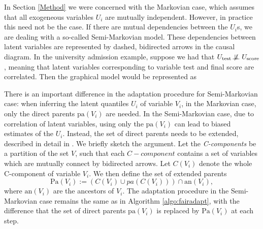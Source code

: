 \documentclass[
  notitle]{jss}
\begin{document}
In Section \ref{Method} we were concerned with the Markovian case, which
assumes that all exogeneous variables \(U_i\) are mutually independent.
However, in practice this need not be the case. If there are mutual
dependencies between the \(U_i\)s, we are dealing with a so-called
Semi-Markovian model. These dependencies between latent variables are
represented by dashed, bidirected arrows in the causal diagram. In the
university admission example, suppose we had that
\(U_{\text{test}} \not\!\perp\!\!\!\perp U_{\text{score}}\), meaning
that latent variables corresponding to variable test and final score are
correlated. Then the graphical model would be represented as

\begin{center}
\end{center}

There is an important difference in the adaptation procedure for
Semi-Markovian case: when inferring the latent quantiles \(U_i\) of
variable \(V_i\), in the Markovian case, only the direct parents
\(\mathrm{pa}(V_i)\) are needed. In the Semi-Markovian case, due to
correlation of latent variables, using only the \(\mathrm{pa}(V_i)\) can
lead to biased estimates of the \(U_i\). Instead, the set of direct
parents needs to be extended, described in detail in
\citep{tian2002general}. We briefly sketch the argument. Let the
\textit{C-components} be a partition of the set \(V\), such that each
\(C-component\) contains a set of variables which are mutually connect
by bidirected arrows. Let \(C(V_i)\) denote the whole C-component of
variable \(V_i\). We then define the set of extended parents
\[\mathrm{Pa}(V_i) := (C(V_i) \cup pa(C(V_i))) \cap \mathrm{an}(V_i),\]
where \(\mathrm{an}(V_i)\) are the ancestors of \(V_i\). The adaptation
procedure in the Semi-Markovian case remains the same as in Algorithm
\ref{algo:fairadapt}, with the difference that the set of direct parents
\(\mathrm{pa}(V_i)\) is replaced by \(\mathrm{Pa}(V_i)\) at each step.
\end{document}
